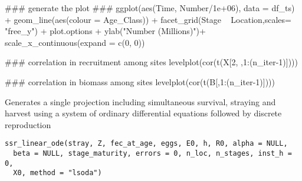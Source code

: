 \documentclass[letterpaper]{book}
\begin{document}
\begin{Examples}
\begin{ExampleCode}
### generate the plot ###
ggplot(aes(Time, Number/1e+06), data = df_ts) + 
  geom_line(aes(colour = Age_Class)) + 
  facet_grid(Stage ~ Location,scales= "free_y") + 
  plot.options + 
  ylab("Number (Millions)")+
  scale_x_continuous(expand = c(0, 0))

### correlation in recruitment among sites
levelplot(cor(t(X[2, ,1:(n_iter-1)])))

### correlation in biomass among sites
levelplot(cor(t(B[,1:(n_iter-1)])))


\end{ExampleCode}
\end{Examples}
%
\begin{Description}\relax
Generates a single projection including simultaneous survival, straying and harvest using a system of ordinary differential equations followed by discrete reproduction
\end{Description}
%
\begin{Usage}
\begin{verbatim}
ssr_linear_ode(stray, Z, fec_at_age, eggs, E0, h, R0, alpha = NULL,
  beta = NULL, stage_maturity, errors = 0, n_loc, n_stages, inst_h = 0,
  X0, method = "lsoda")
\end{verbatim}
\end{Usage}
%
\end{document}
